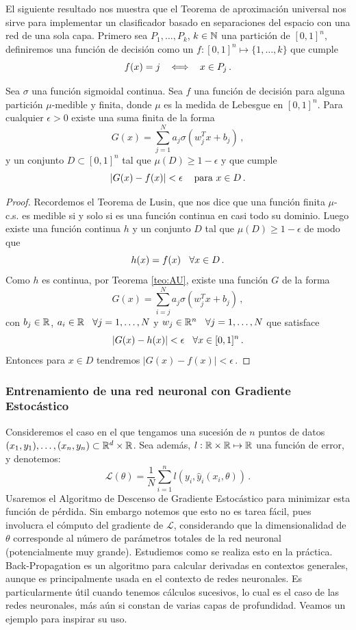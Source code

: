 El siguiente resultado nos muestra que el Teorema de aproximación universal nos sirve para implementar un clasificador basado en separaciones del espacio con una red de una sola capa. Primero sea $P_1,\dots,P_k$, $k\in\mathbb{N}$ una partición de $[0,1]^n$, definiremos una función de decisión como un $f:[0,1]^n\mapsto \{1,\dots,k\}$ que cumple
$$ f(x) = j \hspace{.25cm}\, \Longleftrightarrow \hspace{.25cm}\, x\in P_j \,.$$
\begin{theorem}
Sea $\sigma$ una función sigmoidal continua. Sea $f$ una función de decisión para alguna partición $\mu$-medible y finita, donde $\mu$ es la medida de Lebesgue en $[0,1]^n$. Para cualquier $\epsilon>0$ existe una suma finita de la forma
$$ G(x) = \displaystyle \sum^N_{j=1}a_j\sigma(w^T_jx+b_j) \,,$$
y un conjunto $D\subset [0,1]^n$ tal que $\mu(D)\geq 1-\epsilon$ y que cumple
$$ |G(x)-f(x)|<\epsilon\hspace{.25cm}\, \text{ para }x\in D \,.$$
\end{theorem}
\begin{proof}
\gris
Recordemos el Teorema de Lusin, que nos dice que una función finita $\mu$-c.s. es medible si y solo si es una función continua en casi todo su dominio. Luego existe una función continua $h$ y un conjunto $D$ tal que $\mu(D)\geq 1-\epsilon$ de modo que 
$$ h(x)=f(x) \hspace{.25cm}\, \forall x \in D \,.$$
Como $h$ es continua, por Teorema \ref{teo:AU}, existe una función $G$ de la forma $$G(x)=\displaystyle \sum^N_{i=j}a_j\sigma(w^T_jx+b_j)\,,$$
con  $b_j\in\mathbb{R}$, $a_i\in\mathbb{R}\hspace{.25cm}\, \forall j=1,\dots,N$ y $w_j\in\mathbb{R}^n\hspace{.25cm}\,\forall j=1,\dots,N$ que satisface
$$ |G(x)-h(x)|<\epsilon \hspace{.25cm}\, \forall x\in [0,1]^n\,.$$
Entonces para $x\in D$ tendremos $|G(x)-f(x)|<\epsilon$\,. \findem
\negro
\end{proof}

\subsubsection{Entrenamiento de una red neuronal con Gradiente Estocástico}
Consideremos el caso en el que tengamos una sucesión de $n$ puntos de datos $(x_1,y_1),\dots,(x_n,y_n)\subset \mathbb{R}^d\times\mathbb{R}$. Sea además, $l:\mathbb{R}\times\mathbb{R}\mapsto\mathbb{R}$ una función de error, y denotemos:
$$ \mathcal{L}(\theta) = \displaystyle\frac{1}{N}\sum_{i=1}^n l(y_i,\hat y_i(x_i,\theta)) \,.$$ 
Usaremos el Algoritmo de Descenso de Gradiente Estocástico para minimizar esta función de pérdida. Sin embargo notemos que esto no es tarea fácil, pues involucra el cómputo del gradiente de $\mathcal{L}$, considerando que la dimensionalidad de $\theta$ corresponde al número de parámetros totales de la red neuronal (potencialmente muy grande). Estudiemos como se realiza esto en la práctica.
Back-Propagation es un algoritmo para calcular derivadas en contextos generales, aunque es principalmente usada en el contexto de redes neuronales. Es particularmente útil cuando tenemos cálculos sucesivos, lo cual es el caso de las redes neuronales, más aún si constan de varias capas de profundidad. Veamos un ejemplo para inspirar su uso.

